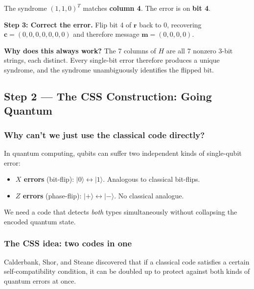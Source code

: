 \documentclass[11pt, a4paper]{article}
\theoremstyle{definition}
\theoremstyle{plain}
\theoremstyle{remark}
\begin{document}
\begin{workedexample}
\noindent
The syndrome $(1,1,0)^T$ matches \textbf{column 4}.
The error is on \textbf{bit 4}.

\medskip\noindent
\textbf{Step 3: Correct the error.}
Flip bit 4 of $\mathbf{r}$ back to 0, recovering
$\mathbf{c} = (0,0,0,0,0,0,0)$ and therefore message
$\mathbf{m} = (0,0,0,0)$.

\medskip\noindent
\textbf{Why does this always work?}
The 7 columns of $H$ are all 7 nonzero 3-bit strings, each distinct.
Every single-bit error therefore produces a unique syndrome, and the
syndrome unambiguously identifies the flipped bit.

\end{workedexample}

\subsection{Step 2 --- The CSS Construction: Going Quantum}

\subsubsection{Why can't we just use the classical code directly?}

In quantum computing, qubits can suffer two independent kinds of
single-qubit error:
\begin{itemize}
  \item \textbf{$X$ errors} (bit-flip):
        $|0\rangle \leftrightarrow |1\rangle$.  Analogous to classical
        bit-flips.
  \item \textbf{$Z$ errors} (phase-flip):
        $|{+}\rangle \leftrightarrow |{-}\rangle$.  No classical
        analogue.
\end{itemize}
We need a code that detects \emph{both} types simultaneously without
collapsing the encoded quantum state.

\subsubsection{The CSS idea: two codes in one}

Calderbank, Shor, and Steane discovered that if a classical code
satisfies a certain self-compatibility condition, it can be doubled up
to protect against both kinds of quantum errors at once.
\end{document}
